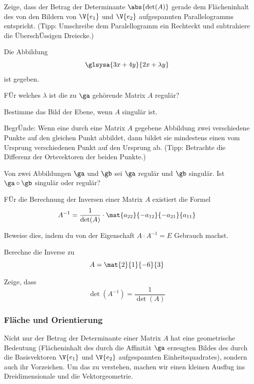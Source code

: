 \documentclass[%
11pt,%
twoside,%
titlepage,%
german,%
headsepline%
]{scrartcl}
\begin{document}
\begin{ueb}
Zeige, dass der Betrag der Determinante $\abs{\det(A)}$ gerade dem Flächeninhalt des von den Bildern von $\V{e_1}$ und $\V{e_2}$ aufgespannten Parallelogramms entspricht. (Tipp: Umschreibe dem Paralellogramm ein Rechteckt und subtrahiere die \"Ubersch\"Ussigen Dreiecke.)
\end{ueb}

\begin{ueb}
Die Abbildung
$$\glsysa{3x+4y}{2x+\lambda y}$$
ist gegeben.
\begin{enumeratea}
\item F\"Ur welches $\lambda$ ist die zu $\ga$ gehörende Matrix $A$ regulär?
\item Bestimme das Bild der Ebene, wenn $A$ singulär ist.
\item Begr\"Unde: Wenn eine durch eine Matrix $A$ gegebene Abbildung zwei verschiedene Punkte auf den gleichen Punkt abbildet, dann bildet sie mindestens einen vom Ursprung verschiedenen Punkt auf den Ursprung ab.
(Tipp: Betrachte die Differenz der Ortsvektoren der beiden Punkte.)
\end{enumeratea}
\end{ueb}

\begin{ueb}
Von zwei Abbildungen $\ga$ und $\gb$ sei $\ga$ regulär und $\gb$ singulär. Ist $\ga\circ\gb$ singulär oder regulär?
\end{ueb}

\begin{ueb}
F\"Ur die Berechnung der Inversen einer Matrix $A$ existiert die Formel
$$A^{-1}=\frac{1}{\det(A)}\cdot\mat{a_{22}}{-a_{12}}{-a_{21}}{a_{11}}$$
\begin{enumeratea}
\item Beweise dies, indem du von der Eigenschaft $A\cdot A^{-1}=E$ Gebrauch machst.
\item Berechne die Inverse zu
$$A=\mat{2}{1}{-6}{3}$$
\item Zeige, dass
$$\det(A^{-1})=\frac{1}{\det(A)}$$
\end{enumeratea}

\end{ueb}

\subsubsection{Fläche und Orientierung}
Nicht nur der Betrag der Determinante einer Matrix $A$ hat eine geometrische Bedeutung (Flächeninhalt des durch die Affinität $\ga$ erzeugten Bildes des durch die Basisvektoren $\V{e_1}$ und $\V{e_2}$ aufgespannten Einheitsquadrates), sondern auch ihr Vorzeichen. Um das zu verstehen, machen wir einen kleinen Ausflug ins Dreidimensionale und die Vektorgeometrie.
\end{document}

